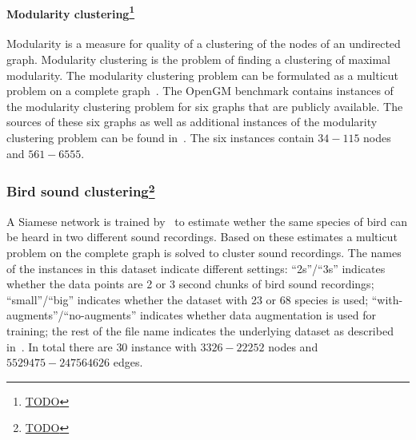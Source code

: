 \paragraph*{Modularity clustering\footnote{\url{TODO}}}
Modularity is a measure for quality of a clustering of the nodes of an undirected graph.
Modularity clustering is the problem of finding a clustering of maximal modularity.
The modularity clustering problem can be formulated as a multicut problem on a complete graph~\cite{brandes2008modularity}.
The OpenGM benchmark contains instances of the modularity clustering problem for six graphs that are publicly available.
The sources of these six graphs as well as additional instances of the modularity clustering problem can be found in~\cite{cafieri2011locally}.
The six instances contain $34-115$ nodes and $561-6555$.

\subsubsection[Bird sound clustering]{Bird sound clustering\footnote{\url{TODO}}}
A Siamese network is trained by~\cite{stein2023correlation} to estimate wether the same species of bird can be heard in two different sound recordings.
Based on these estimates a multicut problem on the complete graph is solved to cluster sound recordings.
The names of the instances in this dataset indicate different settings: ``2s''/``3s'' indicates whether the data points are 2 or 3 second chunks of bird sound recordings; ``small''/``big'' indicates whether the dataset with 23 or 68 species is used; ``with-augments''/``no-augments'' indicates whether data augmentation is used for training; the rest of the file name indicates the underlying dataset as described in~\cite{stein2023correlation}.
In total there are $30$ instance with $3326-22252$ nodes and $5529475-247564626$ edges.



